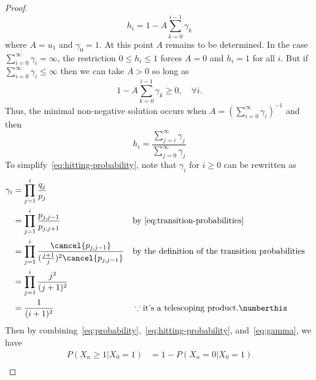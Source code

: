 \documentclass[
  coursecode={MTHE 455},
  assignmentname={Assignment \assignmentnumber},
  studentnumber=20053722,
  name={Bryan Hoang},
]{
  ltxanswer%
}
\begin{document}
\begin{questions}
\begin{solution}
\begin{proof}
        \begin{equation*}
          h_{i} = 1 - A\sum_{k = 0}^{i-1} \gamma_{k}
        \end{equation*}
        where \(A = u_{1}\) and \(\gamma_{0} = 1\). At this point \(A\) remains  to be determined. In the case \(\sum_{i=0}^{\infty} \gamma_{i} = \infty{}\), the restriction \(0 \le h_{i} \le 1\) forces \(A=0\) and \(h_{i} = 1\) for all \(i\). But if \(\sum_{i=0}^{\infty} \gamma_{i} \le \infty{}\) then we can take \(A > 0\) so long as
        \begin{equation*}
          1 - A\sum_{k = 0}^{i-1} \gamma_{k} \ge 0, \quad \forall i.
        \end{equation*}
        Thus, the minimal non-negative solution occurs when \(A = (\sum_{i=0}^{\infty} \gamma_{i})^{-1}\) and then
        \begin{equation}\label{eq:hitting-probability}
          h_{i} = \frac{\sum_{j=i}^{\infty} \gamma_{j}}{\sum_{j=0}^{\infty} \gamma_{j}}
        \end{equation}
        To simplify~\eqref{eq:hitting-probability}, note that \(\gamma_{i}\) for \(i \ge 0\) can be rewritten as
        \begin{align*}
          \gamma_{i} &= \prod_{j=1}^{i} \frac{q_{j}}{p_{j}}                                                                                                                      \\
                     &= \prod_{j=1}^{i} \frac{p_{j,j-1}}{p_{j,j+1}}                                    & &\text{by~\eqref{eq:transition-probabilities}}                          \\
                     &= \prod_{j=1}^{i} \frac{\cancel{p_{j,j-1}}}{(\frac{j+1}{j})^2\cancel{p_{j,j-1}}} & &\text{by the definition of the transition probabilities}               \\
                     &= \prod_{j=1}^{i} \frac{j^2}{(j+1)^2}                                                                                                                      \\
                     &= \frac{1}{(i+1)^2}                                                              & &\because \text{it's a telescoping product.}\numberthis\label{eq:gamma}
        \end{align*}
        Then by combining~\eqref{eq:probability},~\eqref{eq:hitting-probability}, and~\eqref{eq:gamma}, we have
        \begin{align*}
          P(X_{n} \ge 1 | X_{0} = 1) &= 1 - P(X_{n} = 0 | X_{0} = 1)                                                                                  \\

\end{align*}
\end{proof}
\end{solution}
\end{questions}
\end{document}
